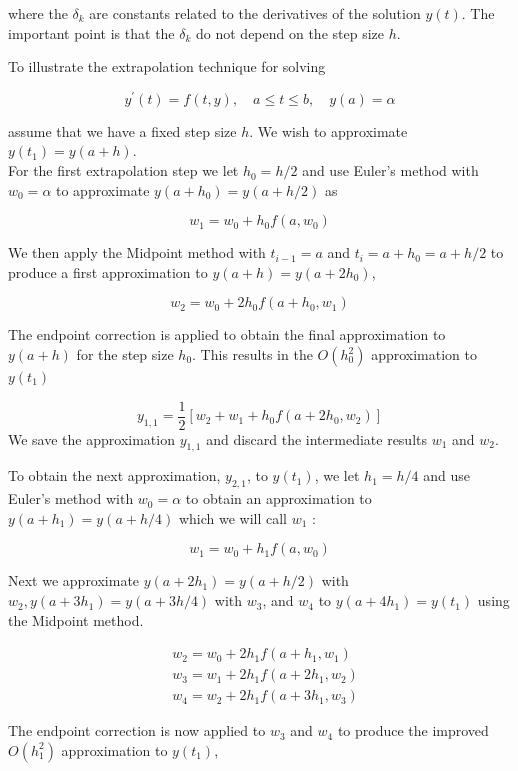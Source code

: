 where the $\delta_{k}$ are constants related to the derivatives of the solution $y(t)$. The important point is that the $\delta_{k}$ do not depend on the step size $h$. 

To illustrate the extrapolation technique for solving

$$
y^{\prime}(t)=f(t, y), \quad a \leq t \leq b, \quad y(a)=\alpha
$$

assume that we have a fixed step size $h$. We wish to approximate $y\left(t_{1}\right)=y(a+h)$.\\
For the first extrapolation step we let $h_{0}=h / 2$ and use Euler's method with $w_{0}=\alpha$ to approximate $y\left(a+h_{0}\right)=y(a+h / 2)$ as

$$
w_{1}=w_{0}+h_{0} f\left(a, w_{0}\right)
$$

We then apply the Midpoint method with $t_{i-1}=a$ and $t_{i}=a+h_{0}=a+h / 2$ to produce a first approximation to $y(a+h)=y\left(a+2 h_{0}\right)$,

$$
w_{2}=w_{0}+2 h_{0} f\left(a+h_{0}, w_{1}\right)
$$

The endpoint correction is applied to obtain the final approximation to $y(a+h)$ for the step size $h_{0}$. This results in the $O\left(h_{0}^{2}\right)$ approximation to $y\left(t_{1}\right)$

$$
y_{1,1}=\frac{1}{2}\left[w_{2}+w_{1}+h_{0} f\left(a+2 h_{0}, w_{2}\right)\right]
$$
We save the approximation $y_{1,1}$ and discard the intermediate results $w_{1}$ and $w_{2}$.

To obtain the next approximation, $y_{2,1}$, to $y\left(t_{1}\right)$, we let $h_{1}=h / 4$ and use Euler's method with $w_{0}=\alpha$ to obtain an approximation to $y\left(a+h_{1}\right)=y(a+h / 4)$ which we will call $w_{1}$ :

$$
w_{1}=w_{0}+h_{1} f\left(a, w_{0}\right)
$$

Next we approximate $y\left(a+2 h_{1}\right)=y(a+h / 2)$ with $w_{2}, y\left(a+3 h_{1}\right)=y(a+3 h / 4)$ with $w_{3}$, and $w_{4}$ to $y\left(a+4 h_{1}\right)=y\left(t_{1}\right)$ using the Midpoint method.

$$
\begin{aligned}
& w_{2}=w_{0}+2 h_{1} f\left(a+h_{1}, w_{1}\right) \\
& w_{3}=w_{1}+2 h_{1} f\left(a+2 h_{1}, w_{2}\right) \\
& w_{4}=w_{2}+2 h_{1} f\left(a+3 h_{1}, w_{3}\right)
\end{aligned}
$$

The endpoint correction is now applied to $w_{3}$ and $w_{4}$ to produce the improved $O\left(h_{1}^{2}\right)$ approximation to $y\left(t_{1}\right)$,

